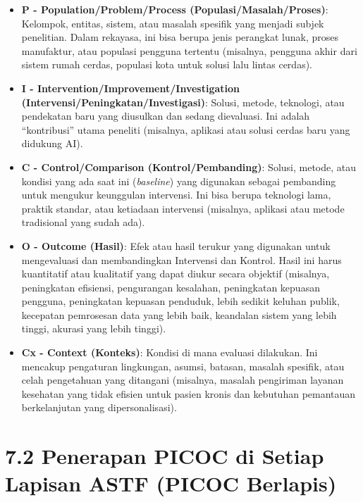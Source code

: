 \documentclass[
  letterpaper,
  DIV=11,
  numbers=noendperiod]{scrreprt}
\providecommand{\tightlist}{%
  \setlength{\itemsep}{0pt}\setlength{\parskip}{0pt}}
\begin{document}
\begin{itemize}
\tightlist
\item
  \textbf{P - Population/Problem/Process (Populasi/Masalah/Proses)}:
  Kelompok, entitas, sistem, atau masalah spesifik yang menjadi subjek
  penelitian. Dalam rekayasa, ini bisa berupa jenis perangkat lunak,
  proses manufaktur, atau populasi pengguna tertentu (misalnya, pengguna
  akhir dari sistem rumah cerdas, populasi kota untuk solusi lalu lintas
  cerdas).
\item
  \textbf{I - Intervention/Improvement/Investigation
  (Intervensi/Peningkatan/Investigasi)}: Solusi, metode, teknologi, atau
  pendekatan baru yang diusulkan dan sedang dievaluasi. Ini adalah
  ``kontribusi'' utama peneliti (misalnya, aplikasi atau solusi cerdas
  baru yang didukung AI).
\item
  \textbf{C - Control/Comparison (Kontrol/Pembanding)}: Solusi, metode,
  atau kondisi yang ada saat ini (\emph{baseline}) yang digunakan
  sebagai pembanding untuk mengukur keunggulan intervensi. Ini bisa
  berupa teknologi lama, praktik standar, atau ketiadaan intervensi
  (misalnya, aplikasi atau metode tradisional yang sudah ada).
\item
  \textbf{O - Outcome (Hasil)}: Efek atau hasil terukur yang digunakan
  untuk mengevaluasi dan membandingkan Intervensi dan Kontrol. Hasil ini
  harus kuantitatif atau kualitatif yang dapat diukur secara objektif
  (misalnya, peningkatan efisiensi, pengurangan kesalahan, peningkatan
  kepuasan pengguna, peningkatan kepuasan penduduk, lebih sedikit
  keluhan publik, kecepatan pemrosesan data yang lebih baik, keandalan
  sistem yang lebih tinggi, akurasi yang lebih tinggi).
\item
  \textbf{Cx - Context (Konteks)}: Kondisi di mana evaluasi dilakukan.
  Ini mencakup pengaturan lingkungan, asumsi, batasan, masalah spesifik,
  atau celah pengetahuan yang ditangani (misalnya, masalah pengiriman
  layanan kesehatan yang tidak efisien untuk pasien kronis dan kebutuhan
  pemantauan berkelanjutan yang dipersonalisasi).
\end{itemize}

\section{\texorpdfstring{\textbf{7.2 Penerapan PICOC di Setiap Lapisan
ASTF (PICOC
Berlapis)}}{7.2 Penerapan PICOC di Setiap Lapisan ASTF (PICOC Berlapis)}}\label{penerapan-picoc-di-setiap-lapisan-astf-picoc-berlapis}
\end{document}
